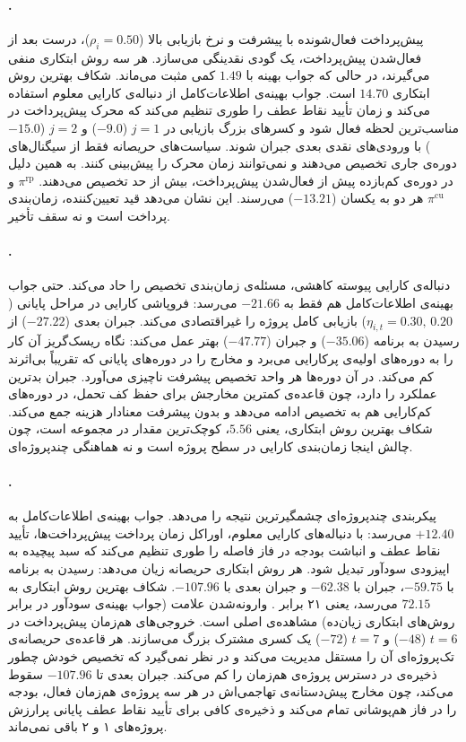 \paragraph{.}
پیش‌پرداخت فعال‌شونده با پیشرفت و نرخ بازیابی بالا ($\rho_i = 0.50$)،
درست بعد از فعال‌شدن پیش‌پرداخت، یک گودی نقدینگی می‌سازد. هر سه روش
ابتکاری  منفی می‌گیرند، در حالی که جواب بهینه با $1.49$ کمی
مثبت می‌ماند. شکاف بهترین روش ابتکاری $14.70$ است. جواب بهینه‌ی
اطلاعات‌کامل از دنباله‌ی کارایی معلوم استفاده می‌کند و زمان تأیید نقاط
عطف را طوری تنظیم می‌کند که محرک پیش‌پرداخت در مناسب‌ترین لحظه فعال
شود و کسرهای بزرگ بازیابی در $j = 1$ ($-9.0$) و $j = 2$ ($-15.0$) با
ورودی‌های نقدی بعدی جبران شوند. سیاست‌های حریصانه فقط از سیگنال‌های
دوره‌ی جاری تخصیص می‌دهند و نمی‌توانند زمان محرک را پیش‌بینی کنند. به
همین دلیل در دوره‌ی کم‌بازده پیش از فعال‌شدن پیش‌پرداخت، بیش از حد
تخصیص می‌دهند. $\pi^{\mathrm{rp}}$ و $\pi^{\mathrm{cu}}$ هر دو به
 یکسان ($-13.21$) می‌رسند. این نشان می‌دهد قید تعیین‌کننده،
زمان‌بندی پرداخت است و نه سقف تأخیر.

\paragraph{.}
دنباله‌ی کارایی پیوسته کاهشی، مسئله‌ی زمان‌بندی تخصیص را حاد می‌کند.
حتی جواب بهینه‌ی اطلاعات‌کامل هم فقط به $-21.66$ می‌رسد: فروپاشی کارایی
در مراحل پایانی ($\eta_{i,t} = 0.30,\, 0.20$) بازیابی کامل پروژه را
غیراقتصادی می‌کند. جبران  بعدی ($-27.22$) از رسیدن به برنامه
($-35.06$) و جبران  ($-47.77$) بهتر عمل می‌کند: نگاه ریسک‌گریز آن
کار را به دوره‌های اولیه‌ی پرکارایی می‌برد و مخارج را در دوره‌های
پایانی که تقریباً بی‌اثرند کم می‌کند. در آن دوره‌ها هر واحد تخصیص
پیشرفت ناچیزی می‌آورد. جبران  بدترین عملکرد را دارد، چون قاعده‌ی
کمترین مخارجش برای حفظ کف تحمل، در دوره‌های کم‌کارایی هم به تخصیص
ادامه می‌دهد و بدون پیشرفت معنادار هزینه جمع می‌کند. شکاف بهترین روش
ابتکاری، یعنی $5.56$، کوچک‌ترین مقدار در مجموعه است، چون چالش اینجا
زمان‌بندی کارایی در سطح پروژه است و نه هماهنگی چندپروژه‌ای.

\paragraph{.}
پیکربندی چندپروژه‌ای چشمگیرترین نتیجه را می‌دهد. جواب بهینه‌ی
اطلاعات‌کامل به $+12.40$ می‌رسد: با دنباله‌های کارایی معلوم، اوراکل
زمان پرداخت پیش‌پرداخت‌ها، تأیید نقاط عطف و انباشت بودجه در فاز فاصله
را طوری تنظیم می‌کند که سبد پیچیده به اپیزودی سودآور تبدیل شود. هر روش
ابتکاری حریصانه زیان می‌دهد: رسیدن به برنامه با $-59.75$، جبران 
با $-62.38$ و جبران  بعدی با $-107.96$. شکاف بهترین روش ابتکاری
به $72.15$ می‌رسد، یعنی ۲۱ برابر . وارونه‌شدن علامت (جواب
بهینه‌ی سودآور در برابر روش‌های ابتکاری زیان‌ده) مشاهده‌ی اصلی است.
خروجی‌های هم‌زمان پیش‌پرداخت در $t = 6$ ($-48$) و $t = 7$ ($-72$) یک
کسری مشترک بزرگ می‌سازند. هر قاعده‌ی حریصانه‌ی تک‌پروژه‌ای آن را مستقل
مدیریت می‌کند و در نظر نمی‌گیرد که تخصیص خودش چطور ذخیره‌ی در دسترس
پروژه‌ی هم‌زمان را کم می‌کند. جبران  بعدی تا $-107.96$ سقوط
می‌کند، چون مخارج پیش‌دستانه‌ی تهاجمی‌اش در هر سه پروژه‌ی هم‌زمان فعال،
بودجه را در فاز هم‌پوشانی تمام می‌کند و ذخیره‌ی کافی برای تأیید نقاط
عطف پایانی پرارزش پروژه‌های ۱ و ۲ باقی نمی‌ماند.


